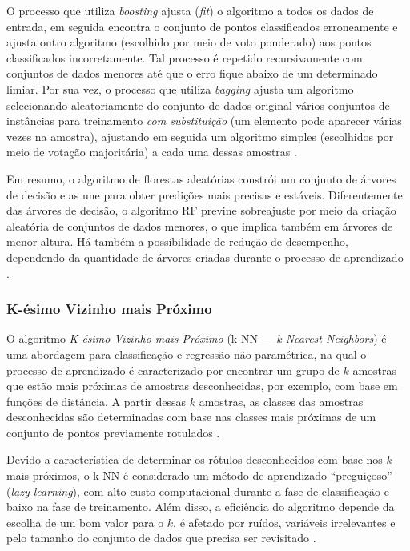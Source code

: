 \documentclass[
	12pt,				%
	oneside,			%
	a4paper,			%
	english,			%
	brazil				%
	]{abntex2ppgsi}
\begin{document}
{O processo que utiliza \textit{boosting} ajusta (\textit{fit}) o algoritmo a todos os dados de entrada, em seguida encontra o conjunto de pontos classificados erroneamente e ajusta outro algoritmo (escolhido por meio de voto ponderado) aos pontos classificados incorretamente. Tal processo é repetido recursivamente com conjuntos de dados menores até que o erro fique abaixo de um determinado limiar.  Por sua vez, o processo que utiliza \textit{bagging} ajusta um algoritmo selecionando aleatoriamente do conjunto de dados original vários conjuntos de instâncias para treinamento \textit{com substituição} (um elemento pode aparecer várias vezes na amostra), ajustando em seguida um algoritmo simples (escolhidos por meio de votação majoritária) a cada uma dessas amostras \cite{mcdonald2014steering, dogru2018traffic}.

Em resumo, o algoritmo de florestas aleatórias constrói um conjunto de árvores de decisão e as une para obter predições mais precisas e estáveis. Diferentemente das árvores de decisão, o algoritmo RF previne sobreajuste por meio da criação aleatória de conjuntos de dados menores, o que implica também em árvores de menor altura. Há também a possibilidade de redução de desempenho, dependendo da quantidade de árvores criadas durante o processo de aprendizado \cite{dogru2018traffic}.

\subsubsection{K-ésimo Vizinho mais Próximo} 

O algoritmo \textit{K-ésimo Vizinho mais Próximo} (k-NN ---  \textit{k-Nearest Neighbors}) é uma abordagem para classificação e regressão não-paramétrica, na  qual o processo de aprendizado é caracterizado por encontrar um grupo de $k$ amostras que estão mais próximas de amostras desconhecidas, por exemplo, com base em funções de distância. A partir dessas $k$ amostras, as classes das amostras desconhecidas são determinadas com base nas classes mais próximas de um conjunto de pontos previamente rotulados \cite{singh2016review, thanh2018comparison}. 

Devido a característica de determinar os rótulos desconhecidos com base nos $k$ mais próximos, o k-NN é considerado um método de aprendizado ``preguiçoso'' (\textit{lazy learning}), com alto custo computacional durante a fase de classificação  e baixo na fase de treinamento. Além disso, a eficiência do algoritmo depende da escolha de um bom valor para o $k$, é afetado por ruídos, variáveis irrelevantes e pelo tamanho do conjunto de dados que precisa ser revisitado \cite{singh2016review, kibanov2018adaptive}. 

}
\end{document}
